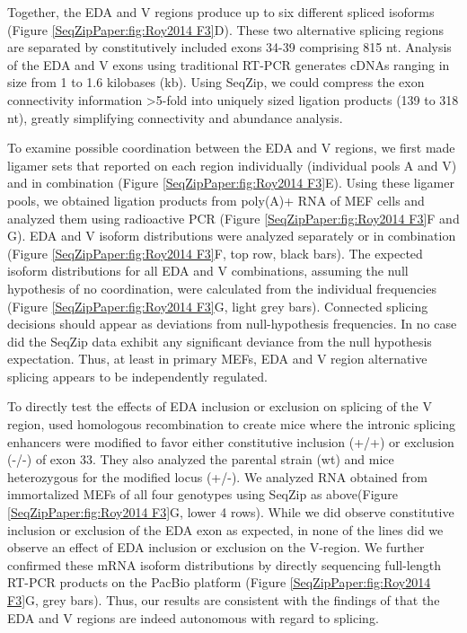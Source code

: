 		Together, the EDA and V regions produce up to six different spliced isoforms (Figure \ref{SeqZipPaper:fig:Roy2014 F3}D). These two alternative splicing regions are separated by constitutively included exons 34-39 comprising 815 nt. Analysis of the EDA and V exons using traditional RT-PCR generates cDNAs ranging in size from 1 to 1.6 kilobases (kb). Using SeqZip, we could compress the exon connectivity information >5-fold into uniquely sized ligation products (139 to 318 nt), greatly simplifying connectivity and abundance analysis.

		To examine possible coordination between the EDA and V regions, we first made ligamer sets that reported on each region individually (individual pools A and V) and in combination (Figure \ref{SeqZipPaper:fig:Roy2014 F3}E). Using these ligamer pools, we obtained ligation products from poly(A)+ RNA of MEF cells and analyzed them using radioactive PCR (Figure \ref{SeqZipPaper:fig:Roy2014 F3}F and G). EDA and V isoform distributions were analyzed separately or in combination (Figure \ref{SeqZipPaper:fig:Roy2014 F3}F, top row, black bars). The expected isoform distributions for all EDA and V combinations, assuming the null hypothesis of no coordination, were calculated from the individual frequencies (Figure \ref{SeqZipPaper:fig:Roy2014 F3}G, light grey bars). Connected splicing decisions should appear as deviations from null-hypothesis frequencies. In no case did the SeqZip data exhibit any significant deviance from the null hypothesis expectation. Thus, at least in primary MEFs, EDA and V region alternative splicing appears to be independently regulated.

		To directly test the effects of EDA inclusion or exclusion on splicing of the V region, \citet{Chauhan2004} used homologous recombination to create mice where the intronic splicing enhancers were modified to favor either constitutive inclusion (+/+) or exclusion (-/-) of exon 33. They also analyzed the parental strain (wt) and mice heterozygous for the modified locus (+/-). We analyzed RNA obtained from immortalized MEFs of all four genotypes using SeqZip as above(Figure \ref{SeqZipPaper:fig:Roy2014 F3}G, lower 4 rows). While we did observe constitutive inclusion or exclusion of the EDA exon as expected, in none of the lines did we observe an effect of EDA inclusion or exclusion on the V-region. We further confirmed these mRNA isoform distributions by directly sequencing full-length RT-PCR products on the PacBio platform (Figure \ref{SeqZipPaper:fig:Roy2014 F3}G, grey bars). Thus, our results are consistent with the findings of \citet{Chauhan2004} that the EDA and V regions are indeed autonomous with regard to splicing.

